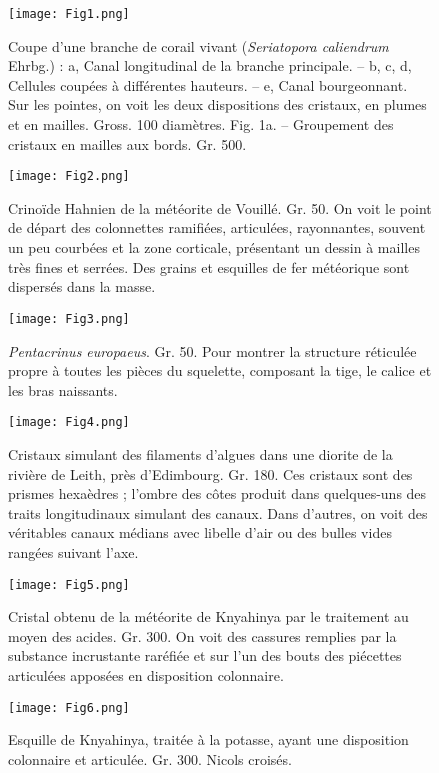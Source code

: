 \documentclass[a4paper, 12pt, oneside, french]{article}
\begin{document}
\clearpage
{}
\begin{figure}[b]
\texttt{[image: Fig1.png]}
\caption{Coupe d'une branche de corail vivant (\emph{Seriatopora caliendrum} Ehrbg.) : a, Canal longitudinal de la branche principale. – b, c, d, Cellules coupées à différentes hauteurs. – e, Canal bourgeonnant. Sur les pointes, on voit les deux dispositions des cristaux, en plumes et en mailles. Gross. 100 diamètres. Fig. 1a. – Groupement des cristaux en mailles aux bords. Gr. 500.}
\centering
\end{figure}
\clearpage
\begin{figure}[b]
\texttt{[image: Fig2.png]}
\caption{Crinoïde Hahnien de la météorite de Vouillé. Gr. 50. On voit le point de départ des colonnettes ramifiées, articulées, rayonnantes, souvent un peu courbées et la zone corticale, présentant un dessin à mailles très fines et serrées. Des grains et esquilles de fer météorique sont dispersés dans la masse.}
\centering
\end{figure}
\clearpage
\begin{figure}[b]
\texttt{[image: Fig3.png]}
\caption{\emph{Pentacrinus europaeus}. Gr. 50. Pour montrer la structure réticulée propre à toutes les pièces du squelette, composant la tige, le calice et les bras naissants.}
\centering
\end{figure}
\clearpage
\begin{figure}[b]
\texttt{[image: Fig4.png]}
\caption{Cristaux simulant des filaments d'algues dans une diorite de la rivière de Leith, près d'Edimbourg. Gr. 180. Ces cristaux sont des prismes hexaèdres ; l'ombre des côtes produit dans quelques-uns des traits longitudinaux simulant des canaux. Dans d'autres, on voit des véritables canaux médians avec libelle d'air ou des bulles vides rangées suivant l'axe.}
\centering
\end{figure}
\clearpage
\begin{figure}[b]
\centering
\texttt{[image: Fig5.png]}
\caption{Cristal obtenu de la météorite de Knyahinya par le traitement au moyen des acides. Gr. 300. On voit des cassures remplies par la substance incrustante raréfiée et sur l'un des bouts des piécettes articulées apposées en disposition colonnaire.}
\end{figure}
\clearpage
\begin{figure}[b]
\centering
\texttt{[image: Fig6.png]}
\caption{Esquille de Knyahinya, traitée à la potasse, ayant une disposition colonnaire et articulée. Gr. 300. Nicols croisés.}
\end{figure}
\end{document}
